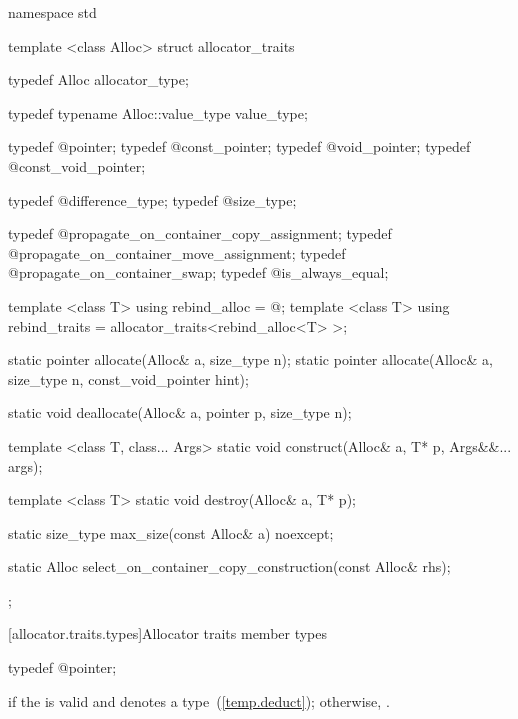 %
\begin{codeblock}
namespace std {
  template <class Alloc> struct allocator_traits {
    typedef Alloc allocator_type;

    typedef typename Alloc::value_type value_type;

    typedef @\seebelow@ pointer;
    typedef @\seebelow@ const_pointer;
    typedef @\seebelow@ void_pointer;
    typedef @\seebelow@ const_void_pointer;

    typedef @\seebelow@ difference_type;
    typedef @\seebelow@ size_type;

    typedef @\seebelow@ propagate_on_container_copy_assignment;
    typedef @\seebelow@ propagate_on_container_move_assignment;
    typedef @\seebelow@ propagate_on_container_swap;
    typedef @\seebelow@ is_always_equal;

    template <class T> using rebind_alloc = @\seebelow@;
    template <class T> using rebind_traits = allocator_traits<rebind_alloc<T> >;

    static pointer allocate(Alloc& a, size_type n);
    static pointer allocate(Alloc& a, size_type n, const_void_pointer hint);

    static void deallocate(Alloc& a, pointer p, size_type n);

    template <class T, class... Args>
      static void construct(Alloc& a, T* p, Args&&... args);

    template <class T>
      static void destroy(Alloc& a, T* p);

    static size_type max_size(const Alloc& a) noexcept;

    static Alloc select_on_container_copy_construction(const Alloc& rhs);
  };
}
\end{codeblock}

[allocator.traits.types]{Allocator traits member types}

%
%
\begin{itemdecl}
typedef @\seebelow@ pointer;
\end{itemdecl}

\begin{itemdescr}
\pnum
\ctype {} if
the   is valid and denotes a
type~(\ref{temp.deduct}); otherwise, .
\end{itemdescr}

